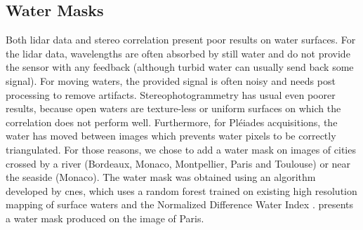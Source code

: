 \subsection{Water Masks}
Both \acrshort{lidar} data and stereo correlation present poor results on water surfaces. For the \acrshort{lidar} data, wavelengths are often absorbed by still water and do not provide the sensor with any feedback (although turbid water can usually send back some signal). For moving waters, the provided signal is often noisy and needs post processing to remove artifacts. Stereophotogrammetry has usual even poorer results, because open waters are texture-less or uniform surfaces on which the correlation does not perform well. Furthermore, for Pléiades acquisitions, the water has moved between images which prevents water pixels to be correctly triangulated. For those reasons, we chose to add a water mask on images of cities crossed by a river (Bordeaux, Monaco, Montpellier, Paris and Toulouse) or near the seaside (Monaco). The water mask was obtained using an algorithm developed by \acrshort{cnes}, which uses a random forest trained on existing high resolution mapping of surface waters \cite{pekel_high-resolution_2016} and the Normalized Difference Water Index \cite{gao_ndwinormalized_1996}.  presents a water mask produced on the image of Paris.

